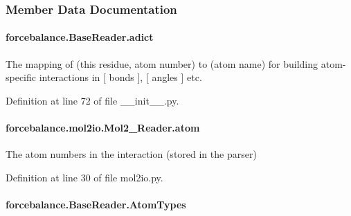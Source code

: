 \subsubsection{Member Data Documentation}
\hypertarget{classforcebalance_1_1BaseReader_a2c46ad6b66cf09a30e917ce4a1997e2a}{
\paragraph[{adict}]{\setlength{\rightskip}{0pt plus 5cm}forcebalance.\-Base\-Reader.\-adict\hspace{0.3cm}{\ttfamily [inherited]}}}\label{classforcebalance_1_1BaseReader_a2c46ad6b66cf09a30e917ce4a1997e2a}


The mapping of (this residue, atom number) to (atom name) for building atom-\/specific interactions in \mbox{[} bonds \mbox{]}, \mbox{[} angles \mbox{]} etc. 



Definition at line 72 of file \-\_\-\-\_\-init\-\_\-\-\_\-.\-py.

\hypertarget{classforcebalance_1_1mol2io_1_1Mol2__Reader_ab65a3dde9c3f2ba716089a52de4bf9fe}{
\paragraph[{atom}]{\setlength{\rightskip}{0pt plus 5cm}forcebalance.\-mol2io.\-Mol2\-\_\-\-Reader.\-atom}}\label{classforcebalance_1_1mol2io_1_1Mol2__Reader_ab65a3dde9c3f2ba716089a52de4bf9fe}


The atom numbers in the interaction (stored in the parser) 



Definition at line 30 of file mol2io.\-py.

\hypertarget{classforcebalance_1_1BaseReader_a69ca7d949a4a3df4d9f61e617fe0e270}{
\paragraph[{Atom\-Types}]{\setlength{\rightskip}{0pt plus 5cm}forcebalance.\-Base\-Reader.\-Atom\-Types\hspace{0.3cm}{\ttfamily [inherited]}}}\label{classforcebalance_1_1BaseReader_a69ca7d949a4a3df4d9f61e617fe0e270}


